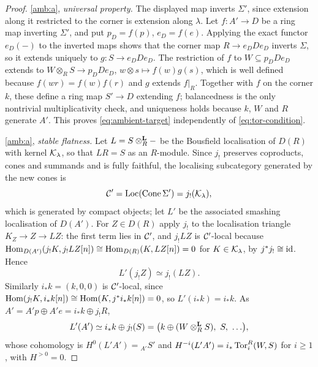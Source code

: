 \begin{proof}
\ref{amb:a}, \emph{universal property.}  The displayed map inverts \(\Sigma'\), since extension along it restricted to the corner is extension along \(\lambda\).  Let \(f:A'\to D\) be a ring map inverting \(\Sigma'\), and put \(p_D=f(p)\), \(e_D=f(e)\).  Applying the exact functor \(e_D(-)\) to the inverted maps shows that the corner map \(R\to e_DDe_D\) inverts \(\Sigma\), so it extends uniquely to \(g:S\to e_DDe_D\).  The restriction of \(f\) to \(W\subseteq p_DDe_D\) extends to \(W\otimes_RS\to p_DDe_D\), \(w\otimes s\mapsto f(w)g(s)\), which is well defined because \(f(wr)=f(w)f(r)\) and \(g\) extends \(f|_R\).  Together with \(f\) on the corner \(k\), these define a ring map \(S'\to D\) extending \(f\); balancedness is the only nontrivial multiplicativity check, and uniqueness holds because \(k\), \(W\) and \(R\) generate \(A'\).  This proves \eqref{eq:ambient-target} independently of \eqref{eq:tor-condition}.

\ref{amb:a}, \emph{stable flatness.}  Let \(L=S\otimes^{\mathbf L}_R-\) be the Bousfield localisation of \(D(R)\) with kernel \(\mathcal K_\lambda\), so that \(LR=S\) as an \(R\)-module.  Since \(j_!\) preserves coproducts, cones and summands and is fully faithful, the localising subcategory generated by the new cones is
\begin{equation}\label{eq:new-kernel}
 \mathcal C'=\operatorname{Loc}(\operatorname{Cone}\Sigma')=j_!(\mathcal K_\lambda),
\end{equation}
which is generated by compact objects; let \(L'\) be the associated smashing localisation of \(D(A')\).  For \(Z\in D(R)\) apply \(j_!\) to the localisation triangle \(K_Z\to Z\to LZ\): the first term lies in \(\mathcal C'\), and \(j_!LZ\) is \(\mathcal C'\)-local because \(\operatorname{Hom}_{D(A')}(j_!K,j_!LZ[n])\cong\operatorname{Hom}_{D(R)}(K,LZ[n])=0\) for \(K\in\mathcal K_\lambda\), by \(j^*j_!\cong\operatorname{id}\).  Hence
\begin{equation}\label{eq:L-prime-j}
 L'(j_!Z)\simeq j_!(LZ).
\end{equation}
Similarly \(i_*k=(k,0,0)\) is \(\mathcal C'\)-local, since \(\operatorname{Hom}(j_!K,i_*k[n])\cong\operatorname{Hom}(K,j^*i_*k[n])=0\), so \(L'(i_*k)=i_*k\).  As \(A'=A'p\oplus A'e=i_*k\oplus j_!R\),
\begin{equation}\label{eq:L-prime-A}
 L'(A')\simeq i_*k\oplus j_!(S)=\bigl(k\oplus(W\Ltensor_RS),\ S,\ \ldots\bigr),
\end{equation}
whose cohomology is \(H^0(L'A')={}_{A'}S'\) and \(H^{-i}(L'A')=i_*\operatorname{Tor}_i^R(W,S)\) for \(i\ge1\), with \(H^{>0}=0\).


\end{proof}

